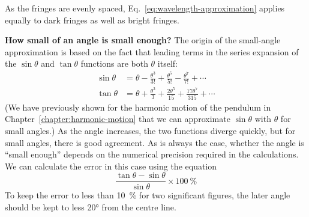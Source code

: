 As the fringes are evenly spaced, Eq.~\ref{eq:wavelength-approximation}
applies equally to dark fringes as well as bright fringes.
\begin{common-question}
  \textbf{How small of an angle is small enough?} The origin of the small-angle
  approximation is based on the fact that leading terms in the series expansion
  of the $\sin\theta$ and $\tan\theta$ functions are both $\theta$ itself:
  \begin{align*}
    \sin\theta &=
    \theta-\frac{\theta^3}{3!}+\frac{\theta^5}{5!}-\frac{\theta^7}{7!}+\cdots\\
    \tan\theta &=
    \theta+\frac{\theta^3}3+\frac{2\theta^5}{15}+\frac{17\theta^7}{315}+\cdots
  \end{align*}
  (We have previously shown for the harmonic motion of the pendulum in
  Chapter~\ref{chapter:harmonic-motion} that we can approximate $\sin\theta$
  with $\theta$ for small angles.) As the angle increases, the two functions
  diverge quickly, but for small angles, there is good agreement. As is always
  the case, whether the angle is ``small enough'' depends on the numerical
  precision required in the calculations. We can calculate the error in this
  case using the equation
  \begin{equation*}
    \frac{\tan\theta-\sin\theta}{\sin\theta}\times\SI{100}\percent
  \end{equation*}
  To keep the error to less than \SI{10}{\percent} for two significant figures,
  the later angle should be kept to less \ang{20} from the centre line.
  \begin{center}
\end{center}
\end{common-question}
